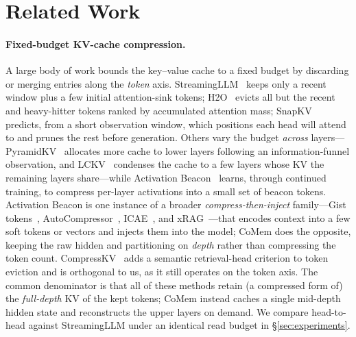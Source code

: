 \section{Related Work}
\label{sec:related}

\paragraph{Fixed-budget KV-cache compression.} A large body of work bounds the
key--value cache to a fixed budget by discarding or merging entries along the
\emph{token} axis. StreamingLLM~\citep{streamingllm} keeps only a recent window
plus a few initial attention-sink tokens; H2O~\citep{h2o} evicts all but the
recent and heavy-hitter tokens ranked by accumulated attention mass;
SnapKV~\citep{snapkv} predicts, from a short observation window, which positions
each head will attend to and prunes the rest before generation. Others vary the
budget \emph{across} layers---PyramidKV~\citep{pyramidkv} allocates more cache to
lower layers following an information-funnel observation, and
LCKV~\citep{lckv} condenses the cache to a few layers whose KV the remaining
layers share---while Activation Beacon~\citep{actbeacon} learns, through
continued training, to compress per-layer activations into a small set of beacon
tokens. Activation Beacon is one instance of a broader
\emph{compress-then-inject} family---Gist tokens~\citep{gist},
AutoCompressor~\citep{autocompressor}, ICAE~\citep{icae}, and
xRAG~\citep{xrag}---that encodes context into a few soft tokens or vectors and
injects them into the model; CoMem does the opposite, keeping the raw hidden and
partitioning on \emph{depth} rather than compressing the token count.
CompressKV~\citep{compresskv} adds a semantic retrieval-head criterion to
token eviction and is orthogonal to us, as it still operates on the token axis.
The common denominator is that all of these methods retain (a compressed form of)
the \emph{full-depth} KV of the kept tokens; CoMem instead caches a single
mid-depth hidden state and reconstructs the upper layers on demand. We compare
head-to-head against StreamingLLM under an identical read budget in
\S\ref{sec:experiments}.

